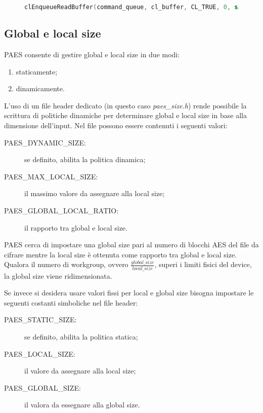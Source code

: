 \documentclass[12pt,a4paper,oneside]{book}
\begin{document}
\begin{figure}
\begin{lstlisting}[caption={\textit{Lettura del risultato dell'esecuzione del kernel.}},label={cod:paes-read-clean},language=C]
clEnqueueReadBuffer(command_queue, cl_buffer, CL_TRUE, 0, sizeof(cl_uchar) * size, buffer, 0, NULL, &event_read);
\end{lstlisting}
\end{figure}

\subsection{Global e local size}
\label{subsec:paes-global-local-size}

PAES consente di gestire global e local size in due modi:
\begin{enumerate}
\item staticamente;
\item dinamicamente.
\end{enumerate}

L'uso di un file header dedicato (in questo caso \textit{paes\_size.h}) rende possibile la scrittura di politiche dinamiche per determinare global e local size in base alla dimensione dell'input. Nel file possono essere contenuti i seguenti valori:
\begin{description}
\item[PAES\_DYNAMIC\_SIZE:] se definito, abilita la politica dinamica;
\item[PAES\_MAX\_LOCAL\_SIZE:] il massimo valore da assegnare alla local size;
\item[PAES\_GLOBAL\_LOCAL\_RATIO:] il rapporto tra global e local size.
\end{description}

PAES cerca di impostare una global size pari al numero di blocchi \ac{AES} del file da cifrare mentre la local size è ottenuta come rapporto tra global e local size. Qualora il numero di workgroup, ovvero $\frac{global\_size}{local\_size}$, superi i limiti fisici del device, la global size viene ridimensionata.

Se invece si desidera usare valori fissi per local e global size bisogna impostare le seguenti costanti simboliche nel file header:
\begin{description}
\item[PAES\_STATIC\_SIZE:] se definito, abilita la politica statica;
\item[PAES\_LOCAL\_SIZE:] il valore da assegnare alla local size;
\item[PAES\_GLOBAL\_SIZE:] il valora da essegnare alla global size.
\end{description}
\end{document}

